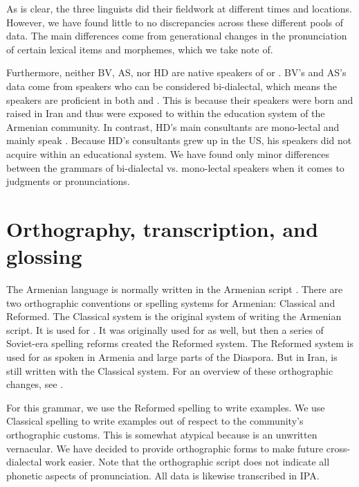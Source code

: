 As is clear, the three linguists did their fieldwork at different times and locations. However, we have found little to no discrepancies across these different pools of data. The main differences come from generational changes in the pronunciation of certain lexical items and morphemes, which we take note of. 

Furthermore, neither BV, AS, nor HD are native speakers of {\seaSEA} or {\iaIA}.  BV's  and AS's data come from speakers who can be considered bi-dialectal, which means the speakers are proficient in both {\iaIA} and {\seaSEA}. This is because their speakers were born and raised in Iran and thus were exposed to {\seaSEA} within the education system of the Armenian community. In contrast, HD's main consultants are mono-lectal and mainly speak {\iaIA}. Because HD's consultants grew up in the US, his speakers did not acquire {\seaSEA} within an educational system.  We have found only  minor   differences between the grammars of bi-dialectal vs. mono-lectal speakers when it comes to {\iaIA} judgments or pronunciations.

\section{Orthography, transcription, and glossing}\label{section: intro: ortho transc gloss}
The Armenian language is normally written in the Armenian script \citep{sanjian-1996-armenianAlphabet}. There are two orthographic conventions or spelling systems for Armenian: Classical and Reformed. The Classical system is the original system of writing the Armenian script. It is used for {\swaSW}. It was originally used for {\seaSEA} as well, but then a series of Soviet-era spelling reforms created the Reformed system. The Reformed system is used for {\seaSEA} as spoken in Armenia and large parts of the Diaspora. But in Iran, {\seaSEA} is still written with the Classical system. For an overview of these orthographic changes, see \citet[5--6, 12]{DumTragut-2009-ArmenianReferenceGrammar}.

For this grammar, we use the Reformed spelling to write {\seaSEA} examples. We use Classical spelling to write {\iaIA} examples out of respect to the community's orthographic customs. This is somewhat atypical because {\iaIA} is an unwritten vernacular. We have decided to provide orthographic forms to make future cross-dialectal work easier. Note that the orthographic script does not indicate all phonetic aspects of {\iaIA} pronunciation. All data is likewise transcribed in IPA. 

